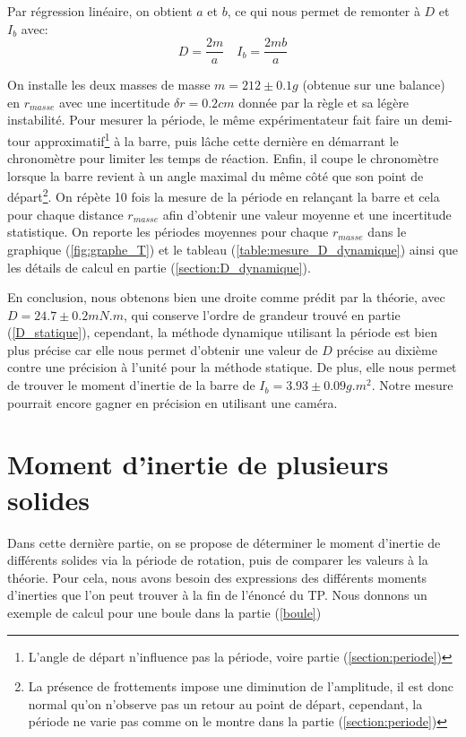 \documentclass[11pt]{article}
\begin{document}
Par régression linéaire, on obtient $a$ et $b$, ce qui nous permet de remonter à $D$ et $I_b$ avec:
\begin{equation}
    D = \frac{2m}{a} \quad I_b = \frac{2mb}{a}
\end{equation}

On installe les deux masses de masse $m = 212 \pm 0.1g$ (obtenue sur une balance) en $r_{masse}$ avec une incertitude $\delta r = 0.2cm$ donnée par la règle et sa légère instabilité.
Pour mesurer la période, le même expérimentateur fait faire un demi-tour approximatif\footnote{L'angle de départ n'influence pas la période, voire partie (\ref{section:periode})} à la barre,
puis lâche cette dernière en démarrant le chronomètre pour limiter les temps de réaction. Enfin, il coupe le chronomètre lorsque la barre revient à un angle maximal du même côté que son point de
départ\footnote{La présence de frottements impose une diminution de l'amplitude, il est donc normal qu'on n'observe pas un retour au point de départ, cependant, 
la période ne varie pas comme on le montre dans la partie (\ref{section:periode})}. 
On répète 10 fois la mesure de la période en relançant la barre et cela pour chaque distance $r_{masse}$ 
afin d'obtenir une valeur moyenne et une incertitude statistique. On reporte les périodes moyennes pour 
chaque $r_{masse}$ dans le graphique (\ref{fig:graphe_T}) et le tableau (\ref{table:mesure_D_dynamique}) ainsi que les détails de calcul en 
partie (\ref{section:D_dynamique}).

En conclusion, nous obtenons bien une droite comme prédit par la théorie, avec $D = 24.7 \pm 0.2 mN.m$, qui conserve l'ordre de grandeur trouvé en partie (\ref{D_statique}), cependant, la méthode
dynamique utilisant la période est bien plus précise car elle nous permet d'obtenir une valeur de $D$ précise au dixième contre une précision
à l'unité pour la méthode statique. De plus, elle nous permet de trouver le moment d'inertie de la barre de $I_b = 3.93 \pm 0.09g.m^2$. Notre mesure pourrait
encore gagner en précision en utilisant une caméra.

\section{Moment d'inertie de plusieurs solides}
Dans cette dernière partie, on se propose de déterminer le moment d'inertie de différents solides via la période
de rotation, puis de comparer les valeurs à la théorie. Pour cela, nous avons besoin des expressions des différents moments d'inerties que l'on peut trouver à la fin de l'énoncé
du TP. Nous donnons un exemple de calcul pour une boule dans la partie (\ref{boule})
\end{document}
